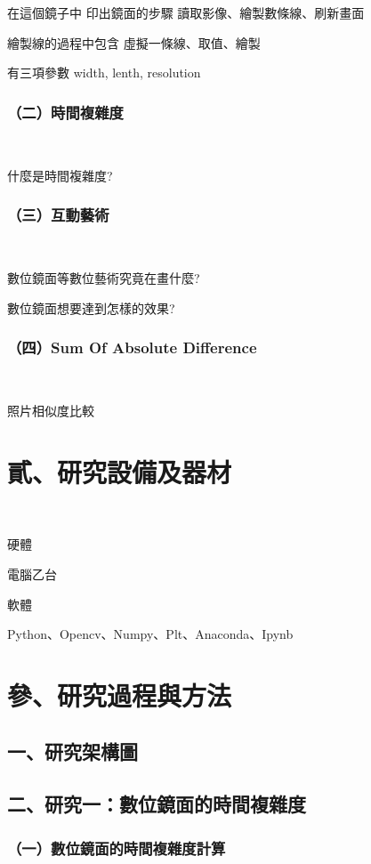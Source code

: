 \documentclass[12pt]{article}
\begin{document}
在這個鏡子中 印出鏡面的步驟 讀取影像、繪製數條線、刷新畫面

繪製線的過程中包含 虛擬一條線、取值、繪製

有三項參數 width, lenth, resolution

\subsubsection{（二）時間複雜度}
\

什麼是時間複雜度?

\subsubsection{（三）互動藝術}
\

數位鏡面等數位藝術究竟在畫什麼?

數位鏡面想要達到怎樣的效果?

\subsubsection{（四）Sum Of Absolute Difference}
\

照片相似度比較

\newpage
\section{貳、研究設備及器材}
\

硬體

電腦乙台

軟體

Python、Opencv、Numpy、Plt、Anaconda、Ipynb

\newpage
\section{參、研究過程與方法}

\subsection{一、研究架構圖}

\subsection{二、研究一：數位鏡面的時間複雜度}

\subsubsection{（一）數位鏡面的時間複雜度計算}
\end{document}
